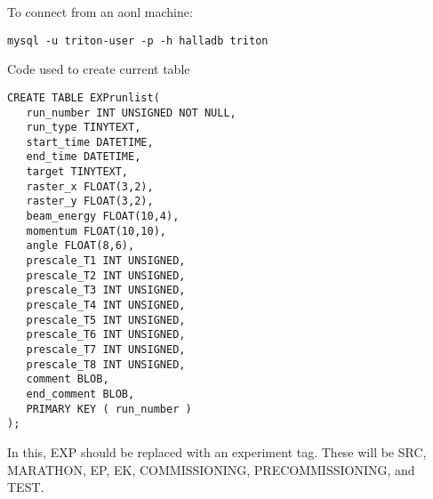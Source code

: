 \documentclass[10pt]{article}
\begin{document}
To connect from an aonl machine:
\begin{verbatim}
mysql -u triton-user -p -h halladb triton
\end{verbatim}

Code used to create current table

\begin{verbatim}
CREATE TABLE EXPrunlist(
   run_number INT UNSIGNED NOT NULL,
   run_type TINYTEXT,
   start_time DATETIME,
   end_time DATETIME,
   target TINYTEXT,
   raster_x FLOAT(3,2),
   raster_y FLOAT(3,2),
   beam_energy FLOAT(10,4),
   momentum FLOAT(10,10),
   angle FLOAT(8,6),
   prescale_T1 INT UNSIGNED,
   prescale_T2 INT UNSIGNED,
   prescale_T3 INT UNSIGNED,
   prescale_T4 INT UNSIGNED,
   prescale_T5 INT UNSIGNED,
   prescale_T6 INT UNSIGNED,
   prescale_T7 INT UNSIGNED,
   prescale_T8 INT UNSIGNED,
   comment BLOB,
   end_comment BLOB,
   PRIMARY KEY ( run_number )
);
\end{verbatim}

In this, EXP should be replaced with an experiment tag. These will be SRC, MARATHON, EP, EK, COMMISSIONING, PRECOMMISSIONING, and TEST. 
\end{document}
